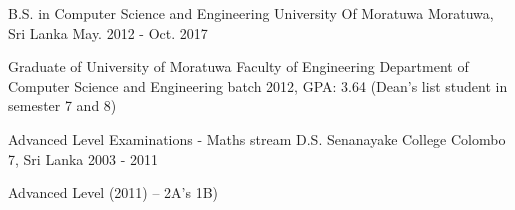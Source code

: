 

\begin{cventries}

  \cventry
    {B.S. in Computer Science and Engineering} %
    {University Of Moratuwa} %
    {Moratuwa, Sri Lanka} %
    {May. 2012 - Oct. 2017} %
    {
      \begin{cvitems} %
        \item {Graduate of University of Moratuwa Faculty of Engineering Department of Computer Science and 
Engineering batch 2012, GPA: 3.64 (Dean’s list student in semester 7 and 8) 
}
      \end{cvitems}
    }

  \cventry
    {Advanced Level Examinations - Maths stream} %
    {D.S. Senanayake College} %
    {Colombo 7, Sri Lanka} %
    {2003 - 2011} %
    {
      \begin{cvitems} %
        \item {Advanced Level (2011) – 2A’s 1B) 
}
      \end{cvitems}
    }

\end{cventries}
